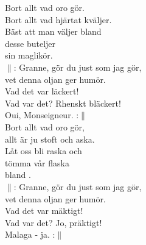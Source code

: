 \documentclass[a6paper, 10pt, twoside]{article}
\begin{document}
\noindent
\begin{center}
\end{center}
\begin{lyrics}
Bort allt vad oro gör.\\
Bort allt vad hjärtat kväljer.\\
Bäst att man väljer bland\\
desse buteljer\\
sin maglikör.
\vspace{5pt}\\
$\|$: Granne, gör du just som jag gör,\\
vet denna oljan ger humör.\\
Vad det var läckert!\\
Vad var det? Rhenskt bläckert!\\
Oui, Monseigneur. :$\|$
\vspace{5pt}\\
Bort allt vad oro gör,\\
allt är ju stoft och aska.\\
Låt oss bli raska och\\
tömma vår flaska\\
bland .
\vspace{5pt}\\
$\|$: Granne, gör du just som jag gör,\\
vet denna oljan ger humör.\\
Vad det var mäktigt!\\
Vad var det? Jo, präktigt!\\
Malaga - ja. :$\|$
\end{lyrics}
\end{document}
